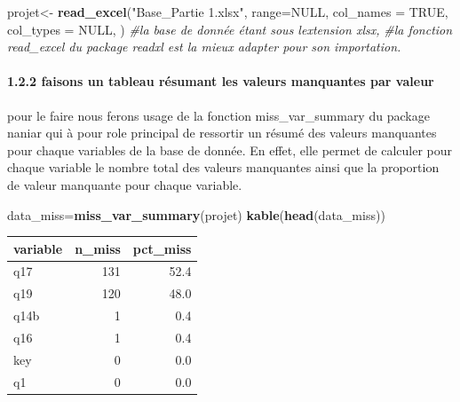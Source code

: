 \documentclass[
]{article}
\newenvironment{Shaded}{\begin{snugshade}}{\end{snugshade}}
\newcommand{\AttributeTok}[1]{\textcolor[rgb]{0.13,0.29,0.53}{#1}}
\newcommand{\CommentTok}[1]{\textcolor[rgb]{0.56,0.35,0.01}{\textit{#1}}}
\newcommand{\ConstantTok}[1]{\textcolor[rgb]{0.56,0.35,0.01}{#1}}
\newcommand{\FunctionTok}[1]{\textcolor[rgb]{0.13,0.29,0.53}{\textbf{#1}}}
\newcommand{\NormalTok}[1]{#1}
\newcommand{\OtherTok}[1]{\textcolor[rgb]{0.56,0.35,0.01}{#1}}
\newcommand{\StringTok}[1]{\textcolor[rgb]{0.31,0.60,0.02}{#1}}
\begin{document}
\begin{Shaded}
\begin{Highlighting}[]
\NormalTok{projet}\OtherTok{\textless{}{-}} \FunctionTok{read\_excel}\NormalTok{(}\StringTok{"Base\_Partie 1.xlsx"}\NormalTok{,}
                    \AttributeTok{range=}\ConstantTok{NULL}\NormalTok{,}
                    \AttributeTok{col\_names =} \ConstantTok{TRUE}\NormalTok{,}
                    \AttributeTok{col\_types =} \ConstantTok{NULL}\NormalTok{,}
\NormalTok{                    ) }\CommentTok{\#la base de donnée étant sous l\textquotesingle{}extension xlsx,}
\CommentTok{\#la fonction read\_excel du package readxl est la mieux adapter pour son importation.}
\end{Highlighting}
\end{Shaded}

\hypertarget{faisons-un-tableau-ruxe9sumant-les-valeurs-manquantes-par-valeur}{%
\paragraph{1.2.2 faisons un tableau résumant les valeurs manquantes par
valeur}\label{faisons-un-tableau-ruxe9sumant-les-valeurs-manquantes-par-valeur}}

pour le faire nous ferons usage de la fonction miss\_var\_summary du
package naniar qui à pour role principal de ressortir un résumé des
valeurs manquantes pour chaque variables de la base de donnée. En effet,
elle permet de calculer pour chaque variable le nombre total des valeurs
manquantes ainsi que la proportion de valeur manquante pour chaque
variable.

\begin{Shaded}
\begin{Highlighting}[]
\NormalTok{data\_miss}\OtherTok{=}\FunctionTok{miss\_var\_summary}\NormalTok{(projet)}
\FunctionTok{kable}\NormalTok{(}\FunctionTok{head}\NormalTok{(data\_miss))}
\end{Highlighting}
\end{Shaded}

\begin{longtable}[]{@{}lrr@{}}
\toprule\noalign{}
variable & n\_miss & pct\_miss \\
\midrule\noalign{}
\endhead
\bottomrule\noalign{}
\endlastfoot
q17 & 131 & 52.4 \\
q19 & 120 & 48.0 \\
q14b & 1 & 0.4 \\
q16 & 1 & 0.4 \\
key & 0 & 0.0 \\
q1 & 0 & 0.0 \\
\end{longtable}
\end{document}
